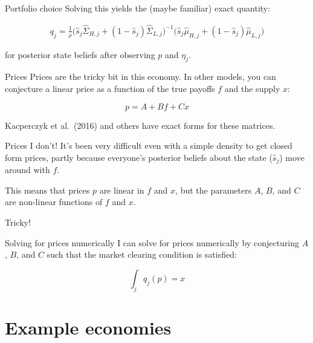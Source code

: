 \documentclass[
  ignorenonframetext,
]{beamer}
\begin{document}
\begin{frame}{Portfolio choice}
\protect\hypertarget{portfolio-choice-1}{}
Solving this yields the (maybe familiar) exact quantity:

\newcommand{\shat}{\hat s_j}
\newcommand{\hShat}{\hat \Sigma_{H,j}}
\newcommand{\lShat}{\hat \Sigma_{L,j}}
\newcommand{\hMhat}{\hat \mu_{H,j}}
\newcommand{\lMhat}{\hat \mu_{L,j}}

\begin{align}
    q_j = \frac{1}{\rho}\big(\hat s_j\hat \Sigma_{H,j}+ (1-\hat s_j) \hat \Sigma_{L,j}\big)^{-1}\big(\hat s_j\hat \mu_{H,j}+ (1-\hat s_j) \hat \mu_{L,j}\big)
\end{align}

for posterior state beliefs after observing \(p\) and \(\eta_j\).
\end{frame}

\begin{frame}{Prices}
\protect\hypertarget{prices}{}
Prices are the tricky bit in this economy. In other models, you can
conjecture a linear price as a function of the true payoffs \(f\) and
the supply \(x\):

\[
p = A + B f + C x
\]

Kacperczyk et al.~(2016) and others have exact forms for these matrices.
\end{frame}

\begin{frame}{Prices}
\protect\hypertarget{prices-1}{}
I don't! It's been very difficult even with a simple density to get
closed form prices, partly because everyone's posterior beliefs about
the state (\(\hat s_j\)) move around with \(f\).

This means that prices \(p\) are linear in \(f\) and \(x\), but the
parameters \(A\), \(B\), and \(C\) are non-linear functions of \(f\) and
\(x\).

Tricky!
\end{frame}

\begin{frame}{Solving for prices numerically}
\protect\hypertarget{solving-for-prices-numerically}{}
I can solve for prices numerically by conjecturing \(A\), \(B\), and
\(C\) such that the market clearing condition is satisfied:

\[
\int_j q_j(p) = x
\]
\end{frame}

\hypertarget{example-economies}{%
\section{Example economies}\label{example-economies}}
\end{document}
